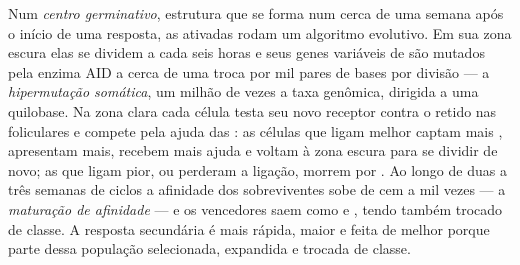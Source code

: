 \begin{definition}\label{def:b3:adaptive-immunity:germinal-centre}
Num \emph{centro germinativo}, estrutura que se forma num 
cerca de uma semana após o início de uma resposta, as  ativadas
rodam um algoritmo evolutivo. Em sua zona escura elas se dividem a cada
seis horas e seus genes variáveis de  são mutados pela enzima
AID a cerca de uma troca por mil pares de bases por divisão --- a
\emph{hipermutação somática}, um milhão de vezes a taxa genômica,
dirigida a uma quilobase. Na zona clara cada célula testa seu novo
receptor contra o  retido nas  foliculares e
compete pela ajuda das : as células que ligam melhor captam
mais , apresentam mais, recebem mais ajuda e voltam à zona
escura para se dividir de novo; as que ligam pior, ou perderam a
ligação, morrem por . Ao longo de duas a três semanas de ciclos
a afinidade dos  sobreviventes sobe de cem a mil vezes --- a
\emph{maturação de afinidade} --- e os vencedores saem como 
e , tendo também trocado de classe. A resposta
secundária é mais rápida, maior e feita de  melhor porque parte
dessa população selecionada, expandida e trocada de classe.
\end{definition}

